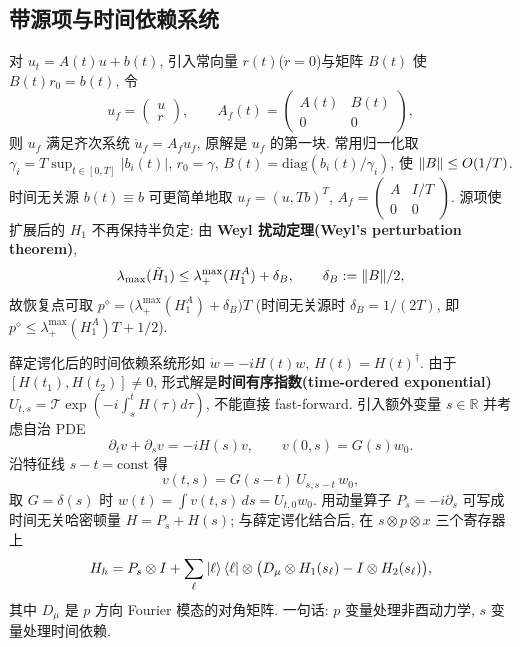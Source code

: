 \documentclass[utf8]{article} %
\numberwithin{equation}{section}   %
\newtheorem{Note}{\hskip 2em {\color{red} 注}}[subsection]
\begin{document}
\subsection{带源项与时间依赖系统}

\begin{Note}
    对 $u_t = A(t)u + b(t)$, 引入常向量 $r(t)$($\dot r = 0$)与矩阵 $B(t)$
    使 $B(t)r_0 = b(t)$, 令
    \begin{equation}
        u_f = \begin{pmatrix} u \\ r \end{pmatrix}, \qquad
        A_f(t) = \begin{pmatrix} A(t) & B(t) \\ 0 & 0 \end{pmatrix},
    \end{equation}
    则 $u_f$ 满足齐次系统 $\dot u_f = A_f u_f$, 原解是 $u_f$ 的第一块.
    常用归一化取 $\gamma_i = T\sup_{t\in[0,T]}|b_i(t)|$, $r_0 = \gamma$,
    $B(t) = \mathrm{diag}(b_i(t)/\gamma_i)$, 使 $\norm{B} \le O(1/T)$.
    时间无关源 $b(t) \equiv b$ 可更简单地取
    $u_f = (u, Tb)^T$, $A_f = \begin{pmatrix} A & I/T \\ 0 & 0 \end{pmatrix}$.
    源项使扩展后的 $H_1$ 不再保持半负定: 由 \textbf{Weyl 扰动定理(Weyl's perturbation theorem)},
    \[
        \lambda_{\max}(\tilde H_1) \le \lambda_+^{\max}(H_1^A) + \delta_B,
        \qquad \delta_B := \norm{B}/2,
    \]
    故恢复点可取 $p^\diamond = \big(\lambda_+^{\max}(H_1^A) + \delta_B\big)T$
    (时间无关源时 $\delta_B = 1/(2T)$, 即 $p^\diamond \le \lambda_+^{\max}(H_1^A)T + 1/2$).
\end{Note}

\begin{Note}
    薛定谔化后的时间依赖系统形如 $\dot w = -iH(t)w$, $H(t) = H(t)^\dagger$.
    由于 $[H(t_1), H(t_2)] \neq 0$, 形式解是\textbf{时间有序指数(time-ordered exponential)}
    $U_{t,s} = \mathcal{T}\exp(-i\int_s^t H(\tau)d\tau)$, 不能直接 fast-forward.
    引入额外变量 $s \in \mathbb{R}$ 并考虑自治 PDE
    \begin{equation}
        \partial_t v + \partial_s v = -iH(s)v, \qquad
        v(0,s) = G(s)w_0.
    \end{equation}
    沿特征线 $s - t = \text{const}$ 得
    \begin{equation}
        v(t,s) = G(s-t)\, U_{s,s-t}\, w_0,
    \end{equation}
    取 $G = \delta(s)$ 时 $w(t) = \int v(t,s)\,ds = U_{t,0}w_0$.
    用动量算子 $P_s = -i\partial_s$ 可写成时间无关哈密顿量
    $H = P_s + H(s)$; 与薛定谔化结合后, 在 $s \otimes p \otimes x$ 三个寄存器上
    \[
        H_h = P_s \otimes I + \sum_{\ell} \ket{\ell}\bra{\ell}
        \otimes \big(D_\mu \otimes H_1(s_\ell) - I \otimes H_2(s_\ell)\big),
    \]
    其中 $D_\mu$ 是 $p$ 方向 Fourier 模态的对角矩阵. 一句话:
    $p$ 变量处理非酉动力学, $s$ 变量处理时间依赖.
\end{Note}
\end{document}
